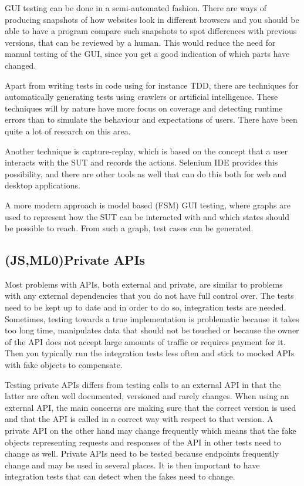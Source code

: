 \documentclass[11pt]{article}
\begin{document}
GUI testing can be done in a semi-automated fashion. There are ways of producing snapshots of how websites look in different browsers and you should be able to have a program compare such snapshots to spot differences with previous versions, that can be reviewed by a human. This would reduce the need for manual testing of the GUI, since you get a good indication of which parts have changed. %

Apart from writing tests in code using for instance TDD, there are techniques for automatically generating tests using crawlers or artificial intelligence. These techniques will by nature have more focus on coverage and detecting runtime errors than to simulate the behaviour and expectations of users. There have been quite a lot of research on this area. %

Another technique is capture-replay, which is based on the concept that a user interacts with the SUT and records the actions. Selenium IDE provides this possibility, and there are other tools as well that can do this both for web and desktop applications.

A more modern approach is model based (FSM) GUI testing, where graphs are used to represent how the SUT can be interacted with and which states should be possible to reach. From such a graph, test cases can be generated.

\subsection{(JS,ML0)Private APIs}

Most problems with APIs, both external and private, are similar to problems with any external dependencies that you do not have full control over. The tests need to be kept up to date and in order to do so, integration tests are needed. Sometimes, testing towards a true implementation is problematic because it takes too long time, manipulates data that should not be touched or because the owner of the API does not accept large amounts of traffic or requires payment for it. Then you typically run the integration tests less often and stick to mocked APIs with fake objects to compensate. \cite[questions~19-20]{Stenmark}

Testing private APIs differs from testing calls to an external API in that the latter are often well documented, versioned and rarely changes. When using an external API, the main concerns are making sure that the correct version is used and that the API is called in a correct way with respect to that version. A private API on the other hand may change frequently which means that the fake objects representing requests and responses of the API in other tests need to change as well. Private APIs need to be tested because endpoints frequently change and may be used in several places. It is then important to have integration tests that can detect when the fakes need to change. \cite[questions~34,~36]{Edelstam}
\end{document}
